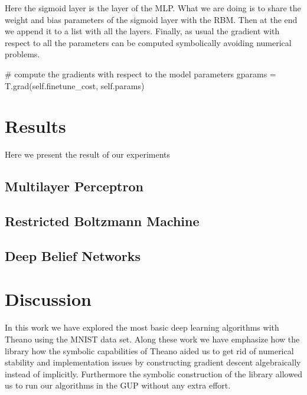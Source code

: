 \documentclass[11pt,a4paper]{article}
\begin{document}
Here the sigmoid layer is the layer of the MLP. What we are doing is to share the weight and bias parameters of the sigmoid layer with the RBM. Then at the end we append it to a list with all the layers. Finally, as usual the gradient with respect to all the parameters can be computed symbolically avoiding numerical problems.

\begin{python}
# compute the gradients with respect to the model parameters
        gparams = T.grad(self.finetune_cost, self.params)

\end{python}


\section{Results}

Here we present the result of our experiments

\subsection{Multilayer Perceptron}



\subsection{Restricted Boltzmann Machine}

\subsection{Deep Belief Networks}

\section{Discussion}

In this work we have explored the most basic deep learning algorithms with Theano using the MNIST data set. Along these work we have emphasize how the library how the symbolic capabilities of Theano aided us to get rid of numerical stability and implementation issues by constructing gradient descent algebraically instead of implicitly. Furthermore the symbolic construction of the library allowed us to run our algorithms in the GUP without any extra effort. 
\end{document}
